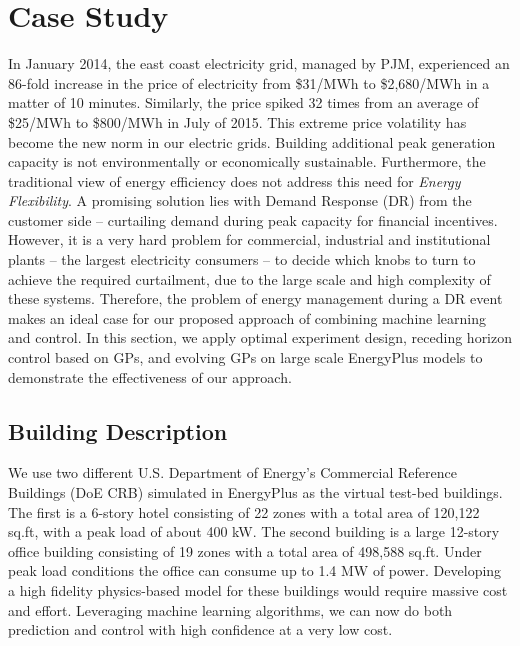 \section{Case Study}
\label{S:casestudy}

In January 2014, the east coast electricity grid, managed by PJM, experienced an 86-fold increase in the price of electricity from \$31/MWh to \$2,680/MWh in a matter of 10 minutes.
Similarly, the price spiked 32 times from an average of \$25/MWh to \$800/MWh in July of 2015.
This extreme price volatility has become the new norm in our electric grids.
Building additional peak generation capacity is not environmentally or economically sustainable.
Furthermore, the traditional view of energy efficiency does not address this need for \emph{Energy Flexibility}.
A promising solution lies with Demand Response (DR) from the customer side -- curtailing demand during peak capacity for financial incentives.
However, it is a very hard problem for commercial, industrial and institutional plants -- the largest electricity consumers -- to decide which knobs to turn to achieve the required curtailment, due to the large scale and high complexity of these systems.
Therefore, the problem of energy management during a DR event makes an ideal case for our proposed approach of combining machine learning and control.
In this section, we apply optimal experiment design, receding horizon control based on GPs, and evolving GPs on large scale EnergyPlus models to demonstrate the effectiveness of our approach. %

\subsection{Building Description}
\label{SS:casestudy:building}
We use two different U.S. Department of Energy's Commercial Reference Buildings (DoE CRB) simulated in EnergyPlus \cite{Deru2011} as the virtual test-bed buildings.
The first is a 6-story hotel consisting of 22 zones with a total area of 120,122 sq.ft, with a peak load of about 400 kW.
The second building is a large 12-story office building consisting of 19 zones with a total area of 498,588 sq.ft. 
Under peak load conditions the office can consume up to 1.4 MW of power. 
Developing a high fidelity physics-based model for these buildings would require massive cost and effort.
Leveraging machine learning algorithms, we can now do both prediction and control with high confidence at a very low cost.

